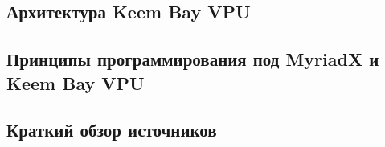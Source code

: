\documentclass{article}
\begin{document}
    
    
    \newpage
    \begin{center}
    \section{Архитектура Keem Bay VPU}
    \end{center}
    
    
    \newpage
    \begin{center} 
    \section{Принципы программирования под MyriadX и Keem Bay VPU}
    \end{center}
    
    
    \newpage
    \begin{center} 
    \section{Краткий обзор источников}
    \end{center}
    
    
\end{document}
